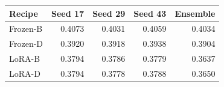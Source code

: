 
{\small\setlength{\tabcolsep}{4pt}
\begin{tabularx}{\textwidth}{Xrrrr}
\toprule
Recipe & Seed 17 & Seed 29 & Seed 43 & Ensemble \\
\midrule
Frozen-B & 0.4073 & 0.4031 & 0.4059 & 0.4034 \\
Frozen-D & 0.3920 & 0.3918 & 0.3938 & 0.3904 \\
LoRA-B & 0.3794 & 0.3786 & 0.3779 & 0.3637 \\
LoRA-D & 0.3794 & 0.3778 & 0.3788 & 0.3650 \\
\bottomrule
\end{tabularx}}
